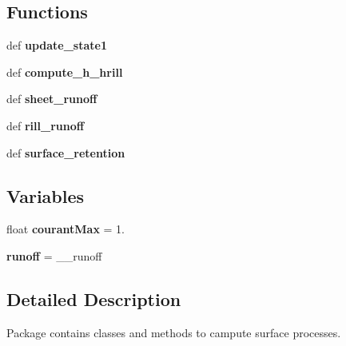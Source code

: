 \subsection*{Functions}
\begin{DoxyCompactItemize}
\item 
\hypertarget{namespacesmoderp2d_1_1src_1_1main__classes_1_1Surface_ab053767349160d45486358c89fe4c0d7}{def {\bfseries update\-\_\-state1}}\label{namespacesmoderp2d_1_1src_1_1main__classes_1_1Surface_ab053767349160d45486358c89fe4c0d7}

\item 
\hypertarget{namespacesmoderp2d_1_1src_1_1main__classes_1_1Surface_a1364ded91cb62f192d22e5e374343ade}{def {\bfseries compute\-\_\-h\-\_\-hrill}}\label{namespacesmoderp2d_1_1src_1_1main__classes_1_1Surface_a1364ded91cb62f192d22e5e374343ade}

\item 
\hypertarget{namespacesmoderp2d_1_1src_1_1main__classes_1_1Surface_a66301090d1b09f77eefbdac3ec7d607d}{def {\bfseries sheet\-\_\-runoff}}\label{namespacesmoderp2d_1_1src_1_1main__classes_1_1Surface_a66301090d1b09f77eefbdac3ec7d607d}

\item 
\hypertarget{namespacesmoderp2d_1_1src_1_1main__classes_1_1Surface_a2cd77250405007f651f12198512bf477}{def {\bfseries rill\-\_\-runoff}}\label{namespacesmoderp2d_1_1src_1_1main__classes_1_1Surface_a2cd77250405007f651f12198512bf477}

\item 
\hypertarget{namespacesmoderp2d_1_1src_1_1main__classes_1_1Surface_a47e4c7c52cde6509830ba5ca6678bf8a}{def {\bfseries surface\-\_\-retention}}\label{namespacesmoderp2d_1_1src_1_1main__classes_1_1Surface_a47e4c7c52cde6509830ba5ca6678bf8a}

\end{DoxyCompactItemize}
\subsection*{Variables}
\begin{DoxyCompactItemize}
\item 
\hypertarget{namespacesmoderp2d_1_1src_1_1main__classes_1_1Surface_a1d40053933ab98f82959cc36c23e27ef}{float {\bfseries courant\-Max} = 1.}\label{namespacesmoderp2d_1_1src_1_1main__classes_1_1Surface_a1d40053933ab98f82959cc36c23e27ef}

\item 
\hypertarget{namespacesmoderp2d_1_1src_1_1main__classes_1_1Surface_adf3531f4f6d835ab675cd162e4f61d08}{{\bfseries runoff} = \-\_\-\-\_\-runoff}\label{namespacesmoderp2d_1_1src_1_1main__classes_1_1Surface_adf3531f4f6d835ab675cd162e4f61d08}

\end{DoxyCompactItemize}


\subsection{Detailed Description}
Package contains classes and methods to campute surface processes. 